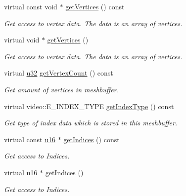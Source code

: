 \begin{DoxyCompactItemize}
virtual const void $\ast$ \hyperlink{classirr_1_1scene_1_1IDynamicMeshBuffer_a433e0e8ec301ce898dc373ca65e30e85}{get\+Vertices} () const
\begin{DoxyCompactList}\small\item\em Get access to vertex data. The data is an array of vertices. \end{DoxyCompactList}\item 
virtual void $\ast$ \hyperlink{classirr_1_1scene_1_1IDynamicMeshBuffer_a449643505823c7cfe793c5a82cde5fa4}{get\+Vertices} ()
\begin{DoxyCompactList}\small\item\em Get access to vertex data. The data is an array of vertices. \end{DoxyCompactList}\item 
virtual \hyperlink{namespaceirr_a0416a53257075833e7002efd0a18e804}{u32} \hyperlink{classirr_1_1scene_1_1IDynamicMeshBuffer_afc317a8ccda7e7eceb1f4955c90848d2}{get\+Vertex\+Count} () const
\begin{DoxyCompactList}\small\item\em Get amount of vertices in meshbuffer. \end{DoxyCompactList}\item 
virtual video\+::\+E\+\_\+\+I\+N\+D\+E\+X\+\_\+\+T\+Y\+PE \hyperlink{classirr_1_1scene_1_1IDynamicMeshBuffer_a3ac73aed8c40103682c5c6388339e70d}{get\+Index\+Type} () const
\begin{DoxyCompactList}\small\item\em Get type of index data which is stored in this meshbuffer. \end{DoxyCompactList}\item 
virtual const \hyperlink{namespaceirr_ae9f8ec82692ad3b83c21f555bfa70bcc}{u16} $\ast$ \hyperlink{classirr_1_1scene_1_1IDynamicMeshBuffer_ab762d23eb5666125dad83ce20f15b4dd}{get\+Indices} () const
\begin{DoxyCompactList}\small\item\em Get access to Indices. \end{DoxyCompactList}\item 
virtual \hyperlink{namespaceirr_ae9f8ec82692ad3b83c21f555bfa70bcc}{u16} $\ast$ \hyperlink{classirr_1_1scene_1_1IDynamicMeshBuffer_a556d8107ac44cbb16892f54370e32812}{get\+Indices} ()
\begin{DoxyCompactList}\small\item\em Get access to Indices. \end{DoxyCompactList}\item 

\end{DoxyCompactItemize}
